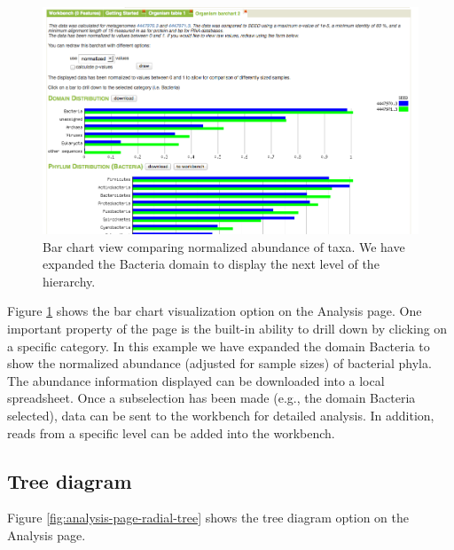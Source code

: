 \documentclass[12pt,fullpage]{report}
\begin{document}
\begin{figure}
\begin{center}
\includegraphics[width=6in]{Images/analysis-page-bar-chart.png}
\end{center}
\caption{
Bar chart view comparing normalized abundance of taxa. We have expanded the Bacteria domain to display the next level of the hierarchy.
}
\label{fig:analysis-page-bar-chart}
\end{figure}

Figure \ref{fig:analysis-page-bar-chart} shows the bar chart visualization option on the Analysis page. One important property of the page is the built-in ability to drill down by clicking on a specific category. In this example we have expanded the domain Bacteria to show the normalized abundance (adjusted for sample sizes) of bacterial phyla. The abundance information displayed can be downloaded into a local spreadsheet. Once a subselection has been made (e.g., the domain Bacteria selected), data can be sent to the workbench for detailed analysis.
In addition, reads from a specific level can be added into the workbench.


\subsection{Tree diagram}

Figure \ref{fig:analysis-page-radial-tree}
shows the tree diagram option on the Analysis page.
\end{document}
